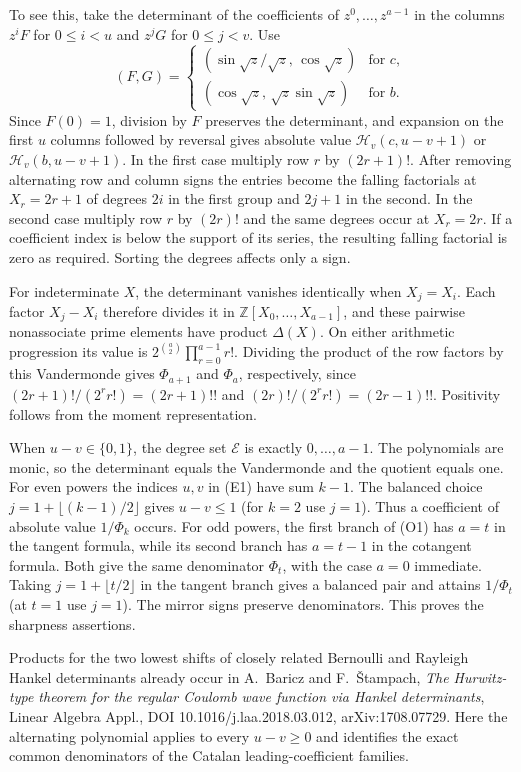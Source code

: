 \documentclass[11pt,a4paper]{article}
\begin{document}
To see this, take the determinant of the coefficients of $z^0,\ldots,z^{a-1}$ in the columns $z^i F$ for $0\le i<u$ and $z^j G$ for $0\le j<v$. Use
\[
 (F,G)=\begin{cases}
 (\sin\sqrt z/\sqrt z,\,\cos\sqrt z)&\text{for }c,\\
 (\cos\sqrt z,\,\sqrt z\sin\sqrt z)&\text{for }b.
 \end{cases}
\]
Since $F(0)=1$, division by $F$ preserves the determinant, and expansion on the first $u$ columns followed by reversal gives absolute value $\mathcal H_v(c,u-v+1)$ or $\mathcal H_v(b,u-v+1)$. In the first case multiply row $r$ by $(2r+1)!$. After removing alternating row and column signs the entries become the falling factorials at $X_r=2r+1$ of degrees $2i$ in the first group and $2j+1$ in the second. In the second case multiply row $r$ by $(2r)!$ and the same degrees occur at $X_r=2r$. If a coefficient index is below the support of its series, the resulting falling factorial is zero as required. Sorting the degrees affects only a sign.

For indeterminate $X$, the determinant vanishes identically when $X_j=X_i$. Each factor $X_j-X_i$ therefore divides it in $\mathbb Z[X_0,\ldots,X_{a-1}]$, and these pairwise nonassociate prime elements have product $\Delta(X)$. On either arithmetic progression its value is $2^{\binom a2}\prod_{r=0}^{a-1}r!$. Dividing the product of the row factors by this Vandermonde gives $\Phi_{a+1}$ and $\Phi_a$, respectively, since $(2r+1)!/(2^r r!)=(2r+1)!!$ and $(2r)!/(2^r r!)=(2r-1)!!$. Positivity follows from the moment representation.

When $u-v\in\{0,1\}$, the degree set $\mathcal E$ is exactly $0,\ldots,a-1$. The polynomials are monic, so the determinant equals the Vandermonde and the quotient equals one. For even powers the indices $u,v$ in (E1) have sum $k-1$. The balanced choice $j=1+\lfloor(k-1)/2\rfloor$ gives $u-v\le1$ (for $k=2$ use $j=1$). Thus a coefficient of absolute value $1/\Phi_k$ occurs. For odd powers, the first branch of (O1) has $a=t$ in the tangent formula, while its second branch has $a=t-1$ in the cotangent formula. Both give the same denominator $\Phi_t$, with the case $a=0$ immediate. Taking $j=1+\lfloor t/2\rfloor$ in the tangent branch gives a balanced pair and attains $1/\Phi_t$ (at $t=1$ use $j=1$). The mirror signs preserve denominators. This proves the sharpness assertions.

Products for the two lowest shifts of closely related Bernoulli and Rayleigh Hankel determinants already occur in A.~Baricz and F.~\v{S}tampach, \emph{The Hurwitz-type theorem for the regular Coulomb wave function via Hankel determinants}, Linear Algebra Appl., DOI 10.1016/j.laa.2018.03.012, arXiv:1708.07729. Here the alternating polynomial applies to every $u-v\ge0$ and identifies the exact common denominators of the Catalan leading-coefficient families.
\end{document}
